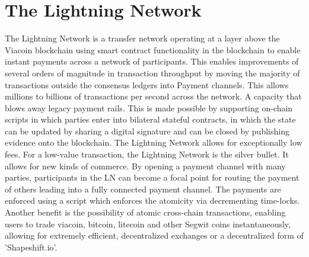 \documentclass{article}
\begin{document}
\section{The Lightning Network}\label{sec: The Lightning Network}
\cite{lightningNetwork}The Lightning Network is a transfer network operating at a layer above the
Viacoin blockchain using smart contract functionality in the blockchain to enable instant payments across a network of participants.
This enables improvements of several orders of magnitude in
transaction throughput by moving the majority of transactions outside the
consensus ledgers into Payment channels. This allows millions to billions of transactions per second across the network.
A capacity that blows away legacy payment rails.
This is made possible by supporting on-chain scripts in which parties enter into bilateral stateful contracts, in which the state
can be updated by sharing a digital signature and can be closed by publishing
evidence onto the blockchain.
\newline \newline \noindent
The Lightning Network allows for exceptionally low fees. For a low-value transaction, the Lightning Network
is the silver bullet. It allows for new kinds of commerce.
By opening a payment channel with many parties, participants in the LN can
become a focal point for routing the payment of others leading into a fully
connected payment channel. The payments are enforced using a script which enforces the atomicity via decrementing time-locks.
\newline \newline \noindent
Another benefit is the possibility of atomic cross-chain transactions, enabling users to trade viacoin, bitcoin, litecoin and other Segwit coins
instantaneously, allowing for extremely efficient, decentralized exchanges or a decentralized form of 'Shapeshift.io'.
\newpage
\end{document}

